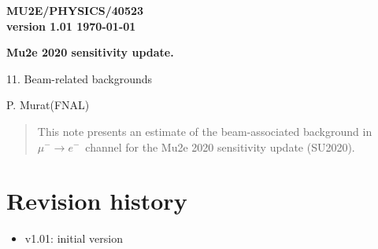 \documentclass[12pt]{article}
\newcommand {\MuToEm}     {\mbox{$\mu^- \ra e^-$}}
\newcommand {\ra}        {\rightarrow}
\begin{document}
\begin{titlepage}
  \begin{flushright}
    \bf {MU2E/PHYSICS/40523} \\
    version 1.01
    \today
 \end{flushright}

  \vspace{1cm}

  \begin{center}
    {\Large \bf Mu2e 2020 sensitivity update.

      \vspace{0.3in}

      11. Beam-related backgrounds
    }

    \vspace{1cm}

    P. Murat(FNAL)

    \vspace{0.3cm}

    \vspace{0.8cm}
  \end{center}

  \begin{abstract}
    This note presents an estimate of the beam-associated background in \MuToEm\ channel
    for the Mu2e 2020 sensitivity update (SU2020).
    \vspace{0.2in}
  \end{abstract}

\end{titlepage}
%
%
%
{\tableofcontents}

% 

\newpage
\section {Revision history}
\begin{itemize}
\item
  v1.01: initial version
\end{itemize}
\end{document}
